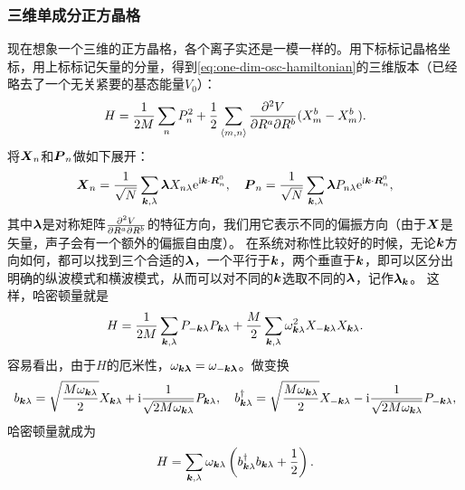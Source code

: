 \documentclass[hyperref, UTF8, a4paper]{ctexart}
\newcommand*{\ii}{\mathrm{i}}
\newcommand*{\ee}{\mathrm{e}}
\newcommand*{\pair}[1]{\langle #1 \rangle}
\begin{document}
\subsubsection{三维单成分正方晶格}

现在想象一个三维的正方晶格，各个离子实还是一模一样的。用下标标记晶格坐标，用上标标记矢量的分量，得到\eqref{eq:one-dim-osc-hamiltonian}的三维版本（已经略去了一个无关紧要的基态能量$V_0$）：
\begin{equation}
    {H} = \frac{1}{2 M} \sum_n {P}_n^2 + \frac{1}{2} \sum_{\pair{m, n}} \pdv{V}{R^a}{R^b} (X_m^a - X_n^a) (X_m^b - X_m^b).
\end{equation}
将$\vb*{X}_n$和$\vb*{P}_n$做如下展开：
\begin{equation}
    \vb*{X}_n = \frac{1}{\sqrt{N}} \sum_{\vb*{k}, \lambda} \vb*{\lambda} X_{n \lambda} \ee^{\ii \vb*{k} \cdot \vb*{R}_n^0}, \quad \vb*{P}_n = \frac{1}{\sqrt{N}} \sum_{\vb*{k}, \lambda} \vb*{\lambda} P_{n \lambda} \ee^{\ii \vb*{k} \cdot \vb*{R}_n^0},
\end{equation}
其中$\vb*{\lambda}$是对称矩阵$\pdv{V}{R^a}{R^b}$的特征方向，我们用它表示不同的偏振方向（由于$\vb*{X}$是矢量，声子会有一个额外的偏振自由度）。
在系统对称性比较好的时候，无论$\vb*{k}$方向如何，都可以找到三个合适的$\vb*{\lambda}$，一个平行于$\vb*{k}$，两个垂直于$\vb*{k}$，即可以区分出明确的纵波模式和横波模式，从而可以对不同的$\vb*{k}$选取不同的$\vb*{\lambda}$，记作$\vb*{\lambda}_{\vb*{k}}$。
这样，哈密顿量就是
\begin{equation}
    {H} = \frac{1}{2 M} \sum_{\vb*{k}, \lambda} {P}_{-\vb*{k} \lambda} {P}_{\vb*{k}\lambda} + \frac{M}{2} \sum_{\vb*{k}, \lambda} \omega_{\vb*{k} \lambda}^2 {X}_{-\vb*{k} \lambda} {X}_{\vb*{k} \lambda}.
\end{equation}
容易看出，由于${H}$的厄米性，$\omega_{\vb*{k}\vb*{\lambda}} = \omega_{-\vb*{k} \vb*{\lambda}}$。做变换
\begin{equation}
    {b}_{\vb*{k} \lambda} = \sqrt{\frac{M \omega_{\vb*{k} \lambda}}{2}} {X}_{\vb*{k} \lambda} + \ii \frac{1}{\sqrt{2 M \omega_{\vb*{k} \lambda}}} P_{\vb*{k} \lambda}, \quad {b}^\dagger_{\vb*{k} \lambda} = \sqrt{\frac{M \omega_{\vb*{k} \lambda}}{2}} {X}_{- \vb*{k} \lambda} - \ii \frac{1}{\sqrt{2 M \omega_{\vb*{k} \lambda}}} P_{- \vb*{k} \lambda},
    \label{eq:transform-b-pq}
\end{equation}
哈密顿量就成为
\begin{equation}
    {H} = \sum_{\vb*{k}, \lambda} \omega_{\vb*{k} \lambda} \left( {b}^\dagger_{\vb*{k} \lambda} {b}_{\vb*{k} \lambda} + \frac{1}{2} \right).
\end{equation}
\end{document}
